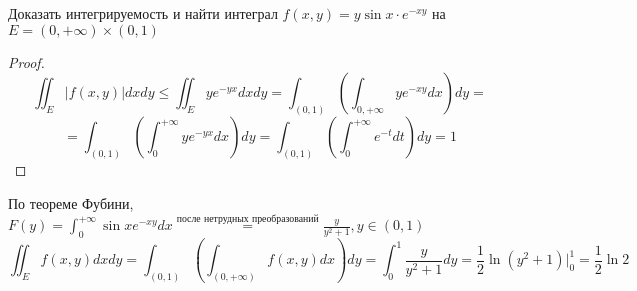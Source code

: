 \begin{example}
    Доказать интегрируемость и найти интеграл \(f(x, y) = y\sin x \cdot e^{-xy}\) на \(E = (0, +\infty) \times (0, 1)\)
\end{example}
\begin{proof}
    \[\iint_E |f(x, y)| dxdy \le \iint_E ye^{-yx}dxdy = \int_{(0, 1)}\left(\int_{0, +\infty}ye^{-xy}dx\right)dy =\]
    \[ = \int_{(0, 1)}\left(\int_0^{+\infty} ye^{-yx}dx\right)dy = \int_{(0, 1)}\left(\int_0^{+\infty} e^{-t}dt\right)dy = 1\]
\end{proof}

По теореме Фубини, \(F(y) = \int_0^{+\infty} \sin x e^{-xy}dx \stackrel{\text{после нетрудных преобразований}}{=}\frac{y}{y^2 + 1}, y \in (0, 1)\)
\[\iint_E f(x, y)dxdy = \int_{(0, 1)}\left(\int_{(0, +\infty)} f(x, y)dx\right)dy = \int_0^1 \frac{y}{y^2 + 1}dy = \frac{1}{2} \ln(y^2 + 1)|_0^1 = \frac{1}{2}\ln 2\]
